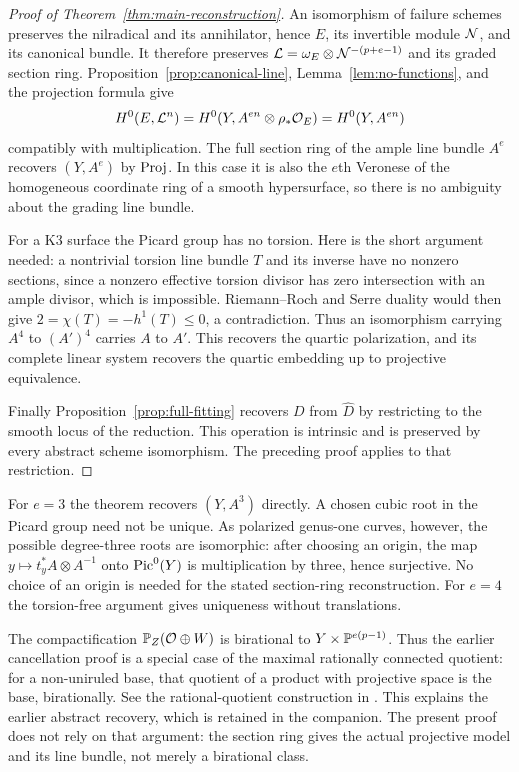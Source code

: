 \begin{proof}[Proof of Theorem~\ref{thm:main-reconstruction}]
An isomorphism of failure schemes preserves the nilradical and its
annihilator, hence $E$, its invertible module $\mathcal N$, and its canonical
bundle. It therefore preserves $\mathcal L=\omega_E\otimes
\mathcal N^{-(p+e-1)}$ and its graded section ring.
Proposition~\ref{prop:canonical-line}, Lemma~\ref{lem:no-functions},
and the projection formula give
\[
 H^0(E,\mathcal L^n)=H^0(Y,A^{en}\otimes\rho_*\mathcal O_E)=H^0(Y,A^{en})
\]
compatibly with multiplication. The full section ring of the ample
line bundle $A^e$ recovers $(Y,A^e)$ by $\operatorname{Proj}$. In this case it is
also the $e$th Veronese of the homogeneous coordinate ring of a smooth
hypersurface, so there is no ambiguity about the grading line bundle.

For a K3 surface the Picard group has no torsion. Here is the short
argument needed: a nontrivial torsion line bundle $T$ and its inverse
have no nonzero sections, since a nonzero effective torsion divisor
has zero intersection with an ample divisor, which is impossible.
Riemann--Roch and Serre duality would then give
$2=\chi(T)=-h^1(T)\le0$, a contradiction. Thus an isomorphism
carrying $A^4$ to $(A')^4$ carries $A$ to $A'$. This recovers the
quartic polarization, and its complete linear system recovers the
quartic embedding up to projective equivalence.

Finally Proposition~\ref{prop:full-fitting} recovers $D$ from
$\widehat D$ by restricting to the smooth locus of the reduction.
This operation is intrinsic and is preserved by every abstract scheme
isomorphism. The preceding proof applies to that restriction.
\end{proof}

\begin{remark}
For $e=3$ the theorem recovers $(Y,A^3)$ directly. A chosen cubic root
in the Picard group need not be unique. As polarized genus-one curves,
however, the possible degree-three roots are isomorphic: after choosing
an origin, the map $y\mapsto t_y^*A\otimes A^{-1}$ onto
$\operatorname{Pic}^0(Y)$ is multiplication by three, hence surjective. No choice
of an origin is needed for the stated section-ring reconstruction.
For $e=4$ the torsion-free argument gives uniqueness without translations.
\end{remark}

\begin{remark}
The compactification $\mathbb P_Z(\mathcal O\oplus W)$ is birational to
$Y\times\mathbb P^{e(p-1)}$. Thus the earlier cancellation proof is a
special case of the maximal rationally connected quotient: for a
non-uniruled base, that quotient of a product with projective space
is the base, birationally. See the rational-quotient construction in
\cite[Chapter IV, \S5]{Kollar}. This explains the earlier abstract
recovery, which is retained in the companion. The present proof does
not rely on that argument: the section ring gives the actual projective
model and its line bundle, not merely a birational class.
\end{remark}
